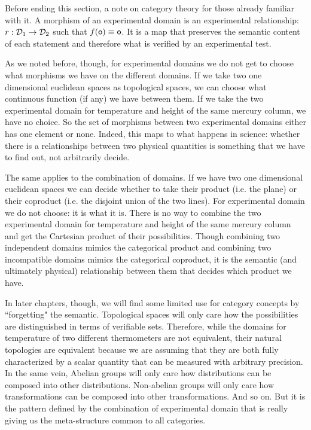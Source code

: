 \documentclass[11pt,letterpaper,fleqn]{memoir} %
\begin{document}
Before ending this section, a note on category theory for those already familiar with it. A morphism of an experimental domain is an experimental relationship: $r : \mathcal{D}_1 \to \mathcal{D}_2$ such that $f(\mathsf{o}) \equiv \mathsf{o}$. It is a map that preserves the semantic content of each statement and therefore what is verified by an experimental test.

As we noted before, though, for experimental domains we do not get to choose what morphisms we have on the different domains. If we take two one dimensional euclidean spaces as topological spaces, we can choose what continuous function (if any) we have between them.  If we take the two experimental domain for temperature and height of the same mercury column, we have no choice. So the set of morphisms between two experimental domains either has one element or none. Indeed, this maps to what happens in science: whether there is a relationships between two physical quantities is something that we have to find out, not arbitrarily decide.

The same applies to the combination of domains. If we have two one dimensional euclidean spaces we can decide whether to take their product (i.e. the plane) or their coproduct (i.e. the disjoint union of the two lines). For experimental domain we do not choose: it is what it is. There is no way to combine the two experimental domain for temperature and height of the same mercury column and get the Cartesian product of their possibilities. Though combining two independent domains mimics the categorical product and combining two incompatible domains mimics the categorical coproduct, it is the semantic (and ultimately physical) relationship between them that decides which product we have.

In later chapters, though, we will find some limited use for category concepts by ``forgetting" the semantic. Topological spaces will only care how the possibilities are distinguished in terms of verifiable sets. Therefore, while the domains for temperature of two different thermometers are not equivalent, their natural topologies are equivalent because we are assuming that they are both fully characterized by a scalar quantity that can be measured with arbitrary precision. In the same vein, Abelian groups will only care how distributions can be composed into other distributions. Non-abelian groups will only care how transformations can be composed into other transformations. And so on. But it is the pattern defined by the combination of experimental domain that is really giving us the meta-structure common to all categories.
\end{document}
